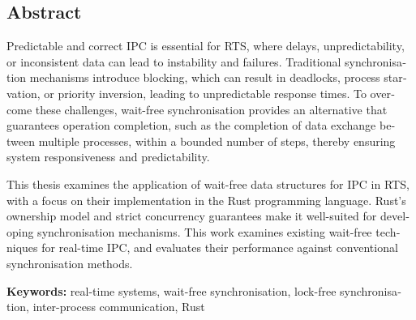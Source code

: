 \begin{otherlanguage}{english}
\chapter*{Abstract}


Predictable and correct \ac{IPC} is essential for \ac{RTS}, where delays, unpredictability, or inconsistent data can lead to instability and failures. Traditional synchronisation mechanisms introduce blocking, which can result in deadlocks, process starvation, or priority inversion, leading to unpredictable response times. To overcome these challenges, wait-free synchronisation provides an alternative that guarantees operation completion, such as the completion of data exchange between multiple processes, within a bounded number of steps, thereby ensuring system responsiveness and predictability.

This thesis examines the application of wait-free data structures for \ac{IPC} in \ac{RTS}, with a focus on their implementation in the Rust programming language. Rust's ownership model and strict concurrency guarantees make it well-suited for developing synchronisation mechanisms. This work examines existing wait-free techniques for real-time \ac{IPC}, and evaluates their performance against conventional synchronisation methods.

\vfill
\noindent\textbf{Keywords:} real-time systems, wait-free synchronisation, lock-free synchronisation, inter-process communication, Rust
\vfill
\end{otherlanguage}
